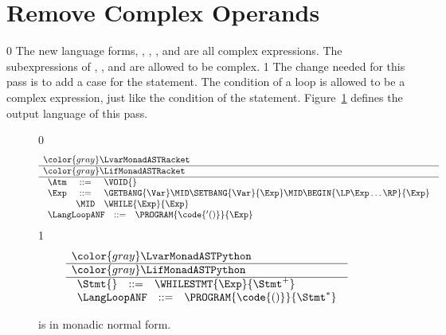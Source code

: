 \documentclass[7x10]{TimesAPriori_MIT}%
\newcommand{\gray}[1]{{\color{gray} #1}}
\def\racketEd{0}
\def\pythonEd{1}
\providecommand{\BookEdition}{1}
\let\edition\BookEdition
\newcommand{\pythonColor}[0]{}
\numberwithin{theorem}{chapter}
\numberwithin{definition}{chapter}
\numberwithin{equation}{chapter}
\begin{document}
\section{Remove Complex Operands}
\label{sec:rco-loop}

{\if\edition\racketEd
%
The new language forms, , , , and
 are all complex expressions. The subexpressions of
, , and  are allowed to be complex.
%
\fi}
{\if\edition\pythonEd\pythonColor
%
The change needed for this pass is to add a case for the 
statement. The condition of a loop is allowed to be a complex
expression, just like the condition of the  statement.
%
\fi}  
%
Figure~\ref{fig:Lwhile-anf-syntax} defines the output language
\LangLoopANF{} of this pass.

\newcommand{\LwhileMonadASTRacket}{
\begin{array}{rcl}
\Atm &::=& \VOID{} \\
\Exp &::=& \GETBANG{\Var}
      \MID \SETBANG{\Var}{\Exp} 
      \MID \BEGIN{\LP\Exp\ldots\RP}{\Exp} \\
      &\MID& \WHILE{\Exp}{\Exp}
\end{array}
}

\newcommand{\LwhileMonadASTPython}{
\begin{array}{rcl}
\Stmt{} &::=& \WHILESTMT{\Exp}{\Stmt^{+}} 
\end{array}
}

\begin{figure}[tp]
  \centering
\begin{tcolorbox}[colback=white]  
\small
{\if\edition\racketEd    
\[
\begin{array}{l}
  \gray{\LvarMonadASTRacket} \\ \hline
  \gray{\LifMonadASTRacket} \\ \hline
  \LwhileMonadASTRacket \\ 
\begin{array}{rcl}
\LangLoopANF  &::=& \PROGRAM{\code{'()}}{\Exp}
\end{array}
\end{array}
\]
\fi}
{\if\edition\pythonEd\pythonColor
\[
\begin{array}{l}
  \gray{\LvarMonadASTPython} \\ \hline
  \gray{\LifMonadASTPython} \\ \hline
  \LwhileMonadASTPython \\
   \begin{array}{rcl}
     \LangLoopANF  &::=& \PROGRAM{\code{()}}{\Stmt^{*}}
   \end{array}
\end{array}
\]
\fi}
\end{tcolorbox}

\caption{\LangLoopANF{} is \LangLoop{} in monadic normal form.}
\label{fig:Lwhile-anf-syntax}
\end{figure}
\end{document}
